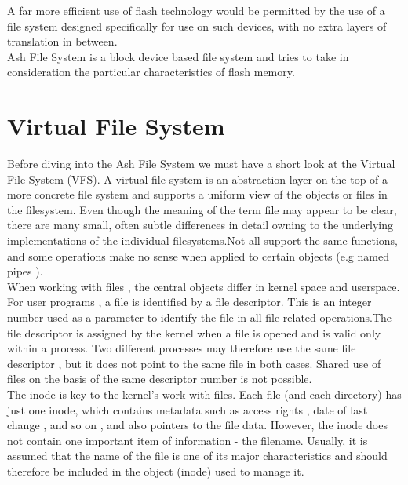 \documentclass[conference]{IEEEtran}
\begin{document}
A far more efficient use of flash technology would be permitted by the use of a file 
system designed specifically for use on such devices, with no extra layers of translation in 
between.\\

Ash File System is a block device based file system and tries to take in consideration
the particular characteristics of flash memory.

\section{Virtual File System}
Before diving into the Ash File System we must have a short look at the Virtual File System (VFS). A virtual file system
is an abstraction layer on the top of a more concrete file system and supports a uniform view of the objects or files
in the filesystem. Even though the meaning of the term file may appear to be clear, there are many small, often subtle 
differences in detail owning to the underlying implementations of the individual filesystems.Not all support the same 
functions, and some operations make no sense when applied to certain objects (e.g named pipes ). \\

When working with files , the central objects differ in kernel space and userspace. For user programs , a file is 
identified by a file descriptor. This is an integer number used as a parameter to identify the file in all file-related
operations.The file descriptor is assigned by the kernel when a file is opened and is valid only within a process. Two 
different processes may therefore use the same file descriptor , but it does not point to the same file in both cases.
Shared use of files on the basis of the same descriptor number is not possible. \\

The inode is key to the kernel's work with files. Each file (and each directory) has just one inode, which contains 
metadata such as  access rights , date of last change , and so on , and also pointers to the file data.
However, the inode does not contain one important item of information - the filename. Usually, it is assumed that the 
name of the file is one of its major characteristics and should therefore be included in the object (inode) used to 
manage it. 
\end{document}
